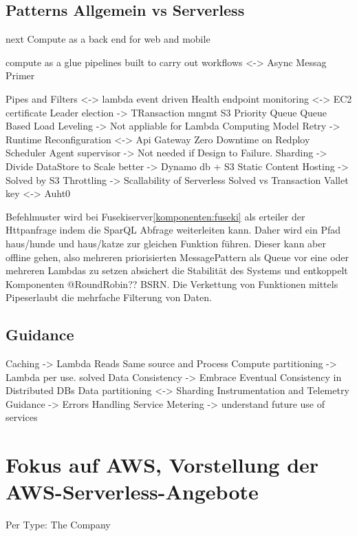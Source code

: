 \documentclass[
12pt,
english,
ngerman,
headsepline,
twoside,
openright,
numbers=noenddot,version=first
]{scrreprt}
\begin{document}
\section{Patterns Allgemein vs Serverless}

next\cite{serverlessArchAWS}
Compute as a back end for web and mobile 

compute as a glue pipelines built to carry out workflows <-> Async Messag Primer\cite{patternsCloud}

Pipes and Filters\cite{patternsCloud} <-> lambda event driven
Health endpoint monitoring <-> EC2 certificate
Leader election -> TRansaction mngmt S3
Priority Queue
Queue Based Load Leveling -> Not appliable for Lambda Computing Model
Retry ->
Runtime Reconfiguration <-> Api Gateway Zero Downtime on Redploy
Scheduler Agent supervisor -> Not needed if Design to Failure.
Sharding -> Divide DataStore to Scale better -> Dynamo db + S3
Static Content Hosting -> Solved by S3
Throttling -> Scallability of Serverless Solved vs Transaction
Vallet key <-> Auht0

Befehlmuster wird bei Fusekiserver\ref{komponenten:fuseki} als erteiler der Httpanfrage indem die SparQL Abfrage weiterleiten kann. Daher wird ein Pfad haus/hunde und haus/katze zur gleichen Funktion führen.
Dieser kann aber offline gehen, also mehreren priorisierten MessagePattern als Queue vor eine oder mehreren Lambdas zu setzen absichert die Stabilität des Systems und entkoppelt Komponenten @RoundRobin?? BSRN.
Die Verkettung von Funktionen mittels \glqq Pipes\grqq erlaubt die mehrfache Filterung von Daten.

\section{Guidance}
Caching -> Lambda Reads Same source and Process
Compute partitioning -> Lambda per use. solved
Data Consistency -> Embrace Eventual Consistency in Distributed DBs
Data partitioning <-> Sharding 
Instrumentation and Telemetry Guidance -> Errors Handling
Service Metering -> understand future use of services

\chapter{Fokus auf AWS, Vorstellung der AWS-Serverless-Angebote}
\label{chap:aws-serverless}
Per Type: The Company
\end{document}
